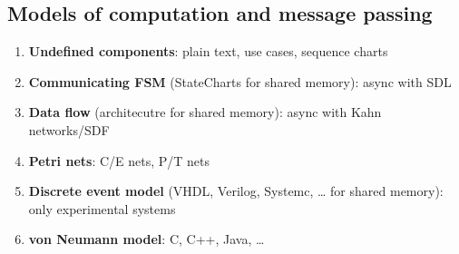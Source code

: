 \documentclass{article}
\begin{document}
\subsection{Models of computation and message passing}
\begin{enumerate}
  \item \textbf{Undefined components}: plain text, use cases, sequence charts
  \item \textbf{Communicating FSM} (StateCharts for shared memory): async with SDL
  \item \textbf{Data flow} (architecutre for shared memory): async with Kahn networks/SDF
  \item \textbf{Petri nets}: C/E nets, P/T nets
  \item \textbf{Discrete event model} (VHDL, Verilog, Systemc, … for shared memory): only experimental systems
  \item \textbf{von Neumann model}: C, C++, Java, …
\end{enumerate}
\end{document}
